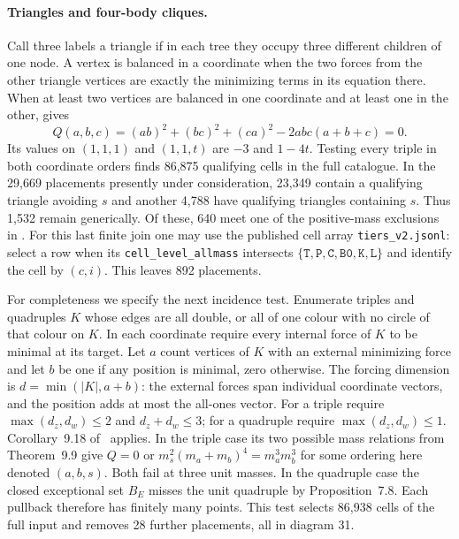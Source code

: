 \documentclass[11pt,letterpaper]{article}
\theoremstyle{definition}
\begin{document}
\paragraph{Triangles and four-body cliques.}
Call three labels a triangle if in each tree they occupy three different
children of one node. A vertex is balanced in a coordinate when the two
forces from the other triangle vertices are exactly the minimizing terms in
its equation there. When at least two vertices are balanced in one coordinate
and at least one in the other, \cite[Cor.~9.10]{Tomar} gives
\[
Q(a,b,c)=(ab)^2+(bc)^2+(ca)^2-2abc(a+b+c)=0 .
\]
Its values on $(1,1,1)$ and $(1,1,t)$ are $-3$ and $1-4t$.
Testing every triple in both coordinate orders finds 86,875 qualifying cells
in the full catalogue. In the 29,669 placements presently under consideration,
23,349 contain a qualifying triangle avoiding $s$ and another 4,788 have
qualifying triangles containing $s$. Thus 1,532 remain generically. Of these,
640 meet one of the positive-mass exclusions in \cite[Lemmas~9.2--9.7]{Tomar}.
For this last finite join one may use the published cell array
\texttt{tiers\_v2.jsonl}: select a row when its
\texttt{cell\_level\_allmass} intersects
$\{\mathtt{T,P,C,B0,K,L}\}$ and identify the cell by $(c,i)$.
This leaves 892 placements.

For completeness we specify the next incidence test. Enumerate triples and
quadruples $K$ whose edges are all double, or all of one colour with no
circle of that colour on $K$. In each coordinate require every internal
force of $K$ to be minimal at its target. Let $a$ count vertices of $K$
with an external minimizing force and let $b$ be one if any position is
minimal, zero otherwise. The forcing dimension is $d=\min(|K|,a+b)$:
the external forces span individual coordinate vectors, and the position
adds at most the all-ones vector. For a triple require
$\max(d_z,d_w)\le2$ and $d_z+d_w\le3$; for a quadruple require
$\max(d_z,d_w)\le1$. Corollary~9.18 of~\cite{Tomar} applies. In the
triple case its two possible mass relations from Theorem~9.9 give $Q=0$
or $m_s^2(m_a+m_b)^4=m_a^3m_b^3$ for some ordering here denoted $(a,b,s)$.
Both fail at three unit masses. In the quadruple case the closed exceptional
set $B_E$ misses the unit quadruple by Proposition~7.8. Each pullback
therefore has finitely many points. This test selects 86,938 cells of the
full input and removes 28 further placements, all in diagram 31.
\end{document}
